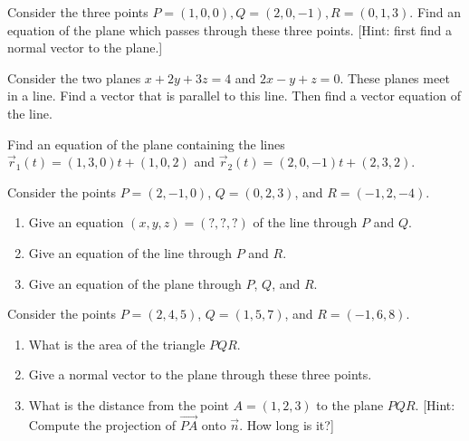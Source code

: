 \begin{problem}  %
Consider the three points $P=(1,0,0), Q=(2,0,-1), R=(0,1,3)$. Find an equation of the plane which passes through these three points.  [Hint: first find a normal vector to the plane.]
\end{problem}

\begin{problem}  %
Consider the two planes $x+2y+3z=4$ and $2x-y+z=0$.  These planes meet in a line.  Find a vector that is parallel to this line.  Then find a vector equation of the line.
\end{problem}

\begin{problem}\label{plane equation 2 lines}%
Find an equation of the plane containing the lines $\vec r_1(t)=(1,3,0)t+(1,0,2)$ and $\vec r_2(t)=(2,0,-1)t+(2,3,2)$.
\end{problem}


\begin{problem}
 Consider the points $P=(2,-1,0)$, $Q=(0,2,3)$, and $R=(-1,2,-4)$.  
\begin{enumerate}
 \item Give an equation $(x,y,z)=(?,?,?)$ of the line through $P$ and $Q$.
 \item Give an equation of the line through $P$ and $R$.
 \item Give an equation of the plane through $P$, $Q$, and $R$. 
\end{enumerate}
\end{problem}

\begin{problem}
 Consider the points $P=(2,4,5)$, $Q=(1,5,7)$, and $R=(-1,6,8)$.
\begin{enumerate}
 \item What is the area of the triangle $PQR$. 
 \item Give a normal vector to the plane through these three points.
 \item What is the distance from the point $A=(1,2,3)$ to the plane $PQR$.  [Hint: Compute the projection of $\vec {PA}$ onto $\vec n$.  How long is it?] 
\end{enumerate}

 
\end{problem}


